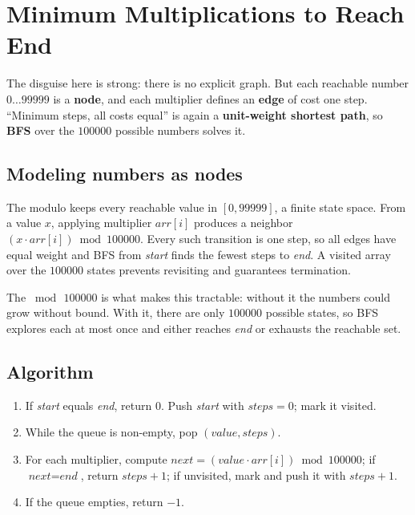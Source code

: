 \section{Minimum Multiplications to Reach End}
\label{sec:graph-min-multiplications}


\begin{patternbox}
The disguise here is strong: there is no explicit graph. But each
reachable number $0\ldots99999$ is a \textbf{node}, and each multiplier
defines an \textbf{edge} of cost one step. ``Minimum steps, all costs
equal'' is again a \textbf{unit-weight shortest path}, so \textbf{BFS}
over the $100000$ possible numbers solves it.
\end{patternbox}

\subsection*{Modeling numbers as nodes}

The modulo keeps every reachable value in $[0,99999]$, a finite state
space. From a value $x$, applying multiplier $\textit{arr}[i]$ produces
a neighbor $(x\cdot\textit{arr}[i])\bmod 100000$. Every such transition
is one step, so all edges have equal weight and BFS from \textit{start}
finds the fewest steps to \textit{end}. A visited array over the
$100000$ states prevents revisiting and guarantees termination.

\begin{ideabox}
The $\bmod\,100000$ is what makes this tractable: without it the numbers
could grow without bound. With it, there are only $100000$ possible
states, so BFS explores each at most once and either reaches
\textit{end} or exhausts the reachable set.
\end{ideabox}

\subsection*{Algorithm}

\begin{enumerate}
  \item If \textit{start} equals \textit{end}, return $0$. Push
        \textit{start} with $\textit{steps}=0$; mark it visited.
  \item While the queue is non-empty, pop $(\textit{value},
        \textit{steps})$.
  \item For each multiplier, compute
        $\textit{next}=(\textit{value}\cdot\textit{arr}[i])\bmod
        100000$; if $\textit{next}=\textit{end}$, return
        $\textit{steps}+1$; if unvisited, mark and push it with
        $\textit{steps}+1$.
  \item If the queue empties, return $-1$.
\end{enumerate}

